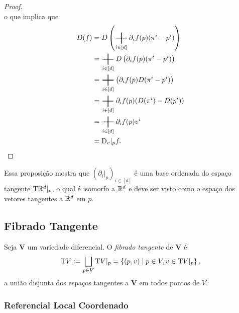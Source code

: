 \begin{proof}
\begin{equation*}
	\end{equation*}
o que implica que
	\begin{align*}
	D(f) &= D\left( \sum_{i \in [d]} \partial_i f(p) (\pi^i-p^i) \right) \\
		&= \sum_{i \in [d]} D\left( \partial_i f(p) (\pi^i-p^i) \right) \\
		&= \sum_{i \in [d]} \left( \partial_i f(p) D(\pi^i-p^i) \right) \\
		&= \sum_{i \in [d]} \partial_i f(p) (D(\pi^i)-D(p^i)) \\
		&= \sum_{i \in [d]} \partial_i f(p) v^i \\
		&= \D_v|_p f.
	\end{align*}
\end{proof}

Essa proposição mostra que $\left( \partial_i|_p \right)_{i \in [d]}$ é uma base ordenada do espaço tangente $\mathrm{T} \mathbb{R}^d|_p$, o qual é isomorfo a $\mathbb{R}^d$ e deve ser visto como o espaço dos vetores tangentes a $\mathbb{R}^d$ em $p$.

\subsection{Fibrado Tangente}

\begin{defi}
Seja $\bm V$ um variedade diferencial. O \emph{fibrado tangente} de $\bm V$ é
	\begin{equation*}
	\mathrm{T} V := \bigsqcup_{p \in V} \mathrm{T} V|_p = \left\{(p,v) \;\middle\vert\; p \in V,v \in \mathrm{T} V|_p \right\},
	\end{equation*}
a união disjunta dos espaços tangentes a $\bm V$ em todos pontos de $V$. 
\end{defi}

\subsubsection{Referencial Local Coordenado}

